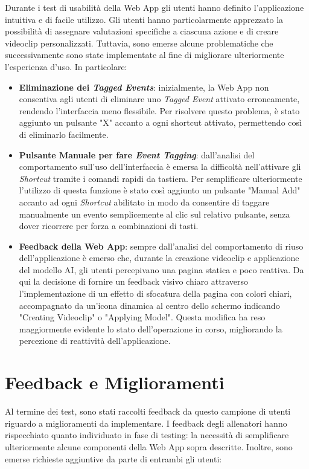 \noindent Durante i test di usabilità della Web App gli utenti hanno definito l'applicazione intuitiva e di facile utilizzo. Gli utenti hanno particolarmente apprezzato la possibilità di assegnare valutazioni specifiche a ciascuna azione e di creare videoclip personalizzati. Tuttavia, sono emerse alcune problematiche che successivamente sono state implementate al fine di migliorare ulteriormente l'esperienza d'uso. In particolare:

\begin{itemize}
    \item \textbf{Eliminazione dei \textit{Tagged Events}}: inizialmente, la Web App non consentiva agli utenti di eliminare uno \textit{Tagged Event} attivato erroneamente, rendendo l'interfaccia meno flessibile. Per risolvere questo problema, è stato aggiunto un pulsante "X" accanto a ogni shortcut attivato, permettendo così di eliminarlo facilmente. 
    \item \textbf{Pulsante Manuale per fare \textit{Event Tagging}}: dall'analisi del comportamento sull'uso dell'interfaccia è emersa la difficoltà nell'attivare gli \textit{Shortcut} tramite i comandi rapidi da tastiera. Per semplificare ulteriormente l'utilizzo di questa funzione è stato così aggiunto un pulsante "Manual Add" accanto ad ogni \textit{Shortcut} abilitato in modo da consentire di taggare manualmente un evento semplicemente al clic sul relativo pulsante, senza dover ricorrere per forza a combinazioni di tasti. 
    \item \textbf{Feedback della Web App}: sempre dall'analisi del comportamento di riuso dell'applicazione è emerso che, durante la creazione videoclip e applicazione del modello AI, gli utenti percepivano una pagina statica e poco reattiva. Da qui la decisione di fornire un feedback visivo chiaro attraverso l'implementazione di un effetto di sfocatura della pagina con colori chiari, accompagnato da un'icona dinamica al centro dello schermo indicando "Creating Videoclip" o "Applying Model". Questa modifica ha reso maggiormente evidente lo stato dell'operazione in corso, migliorando la percezione di reattività dell'applicazione.
    
\end{itemize}

\section{Feedback e Miglioramenti}
Al termine dei test, sono stati raccolti feedback da questo campione di utenti riguardo a miglioramenti da implementare. I feedback degli allenatori hanno rispecchiato quanto individuato in fase di testing: la necessità di semplificare ulteriormente alcune componenti della Web App sopra descritte. Inoltre, sono emerse richieste aggiuntive da parte di entrambi gli utenti:

